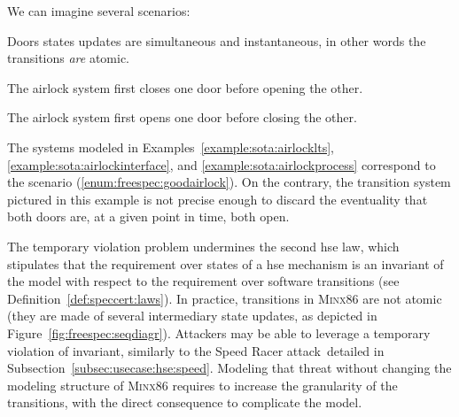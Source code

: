 \begin{example}
\begin{center}
  \end{center}

  We can imagine several scenarios:
  \begin{inparaenum}[(1)]
  \item Doors states updates are simultaneous and instantaneous, in other words
    the transitions \emph{are} atomic.
  \item The airlock system first closes one door before opening the
    other. \label{enum:freespec:goodairlock}
  \item The airlock system first opens one door before closing the
    other. \label{enum:freespec:badairlock}
  \end{inparaenum}
  The systems modeled in Examples~\ref{example:sota:airlocklts},
  \ref{example:sota:airlockinterface}, and \ref{example:sota:airlockprocess}
  correspond to the scenario (\ref{enum:freespec:goodairlock}).
  On the contrary, the transition system pictured in this example is not precise
  enough to discard the eventuality that both doors are, at a given point in
  time, both open.
\end{example}

The temporary violation problem undermines the second \ac{hse} law, which
stipulates that the requirement over states of a \ac{hse} mechanism is an
invariant of the model with respect to the requirement over software transitions
(see Definition~\ref{def:speccert:laws}).
%
In practice, transitions in {\scshape Minx86} are not atomic (they are made of
several intermediary state updates, as depicted in
Figure~\ref{fig:freespec:seqdiagr}).
%
Attackers may be able to leverage a temporary violation of invariant, similarly
to the Speed Racer attack\,\cite{kallenberg2015racecondition} detailed in
Subsection~\ref{subsec:usecase:hse:speed}.
%
Modeling that threat without changing the modeling structure of {\scshape
  Minx86} requires to increase the granularity of the transitions, with the
direct consequence to complicate the model.

